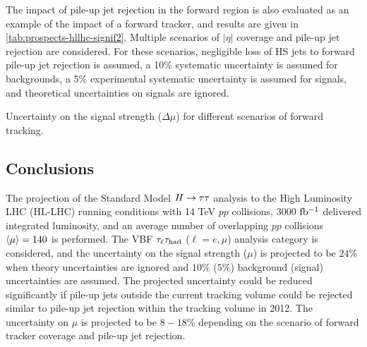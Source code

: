 The impact of pile-up jet rejection in the forward region is also evaluated as an example of the impact of a forward tracker, and results are given in \cref{tab:prospects-hllhc-signif2}. Multiple scenarios of $|\eta|$ coverage and pile-up jet rejection are considered. For these scenarios, negligible loss of HS jets to forward pile-up jet rejection is assumed, a 10\% systematic uncertainty is assumed for backgrounds, a 5\% experimental systematic uncertainty is assumed for signals, and theoretical uncertainties on signals are ignored.

\begin{table}[bp]
  \centering
  \renewcommand{\arraystretch}{1.4}
  \caption{Uncertainty on the signal strength ($\Delta\mu$) for different scenarios of forward tracking.}
  
  \label{tab:prospects-hllhc-signif2}
\end{table}

\subsection{Conclusions}

The projection of the Standard Model $H\rightarrow\tau\tau$ analysis to the High Luminosity LHC (HL-LHC) running conditions with 14 TeV $pp$ collisions, 3000 $\mbox{fb$^{-1}$}$ delivered integrated luminosity, and an average number of overlapping $pp$ collisions $\langle\mu\rangle = 140$ is performed. The VBF $\tau_\ell\tau_\text{had}$ ($\ell = e,\mu$) analysis category is considered, and the uncertainty on the signal strength ($\mu$) is projected to be $24\%$ when theory uncertainties are ignored and $10\%$ ($5\%$) background (signal) uncertainties are assumed. The projected uncertainty could be reduced significantly if pile-up jets outside the current tracking volume could be rejected similar to pile-up jet rejection within the tracking volume in 2012. The uncertainty on $\mu$ is projected to be $8-18\%$ depending on the scenario of forward tracker coverage and pile-up jet rejection.

